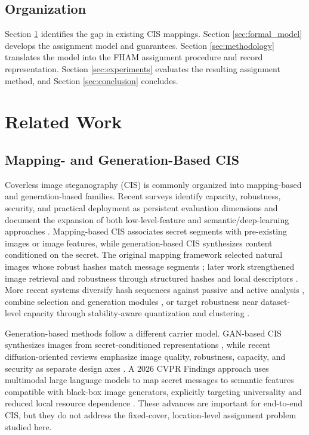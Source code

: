\documentclass[preprint,12pt]{elsarticle}
\theoremstyle{plain}
\begin{document}
\subsection{Organization}
Section \ref{sec:related} identifies the gap in existing CIS mappings. Section \ref{sec:formal_model} develops the assignment model and guarantees. Section \ref{sec:methodology} translates the model into the FHAM assignment procedure and record representation. Section \ref{sec:experiments} evaluates the resulting assignment method, and Section \ref{sec:conclusion} concludes.

\section{Related Work}
\label{sec:related}

\subsection{Mapping- and Generation-Based CIS}
Coverless image steganography (CIS) is commonly organized into mapping-based and generation-based families. Recent surveys identify capacity, robustness, security, and practical deployment as persistent evaluation dimensions and document the expansion of both low-level-feature and semantic/deep-learning approaches \cite{tan2024review,xiang2025survey,zhang2026diffusion}. Mapping-based CIS associates secret segments with pre-existing images or image features, while generation-based CIS synthesizes content conditioned on the secret. The original mapping framework selected natural images whose robust hashes match message segments \cite{zhou2015coverless}; later work strengthened image retrieval and robustness through structured hashes and local descriptors \cite{zheng2018coverless,li2024surf}. More recent systems diversify hash sequences against passive and active analysis \cite{guo2024diverse}, combine selection and generation modules \cite{ren2024joint}, or target robustness near dataset-level capacity through stability-aware quantization and clustering \cite{guo2026capacity}.

Generation-based methods follow a different carrier model. GAN-based CIS synthesizes images from secret-conditioned representations \cite{qin2020gan}, while recent diffusion-oriented reviews emphasize image quality, robustness, capacity, and security as separate design axes \cite{zhang2026diffusion}. A 2026 CVPR Findings approach uses multimodal large language models to map secret messages to semantic features compatible with black-box image generators, explicitly targeting universality and reduced local resource dependence \cite{li2026mllm}. These advances are important for end-to-end CIS, but they do not address the fixed-cover, location-level assignment problem studied here.
\end{document}
